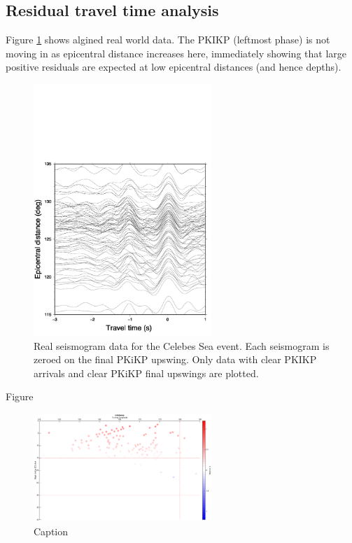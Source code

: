 \documentclass[11pt,a4paper]{article}
\begin{document}
\subsection{Residual travel time analysis}
Figure \ref{fig:Real aligned} shows algined real world data. The PKIKP (leftmost phase) is not moving in as epicentral distance increases here, immediately showing that large positive residuals are expected at low epicentral distances (and hence depths).

\begin{figure}
	\centering
	\includegraphics[width=0.6\textwidth]{figures/celebessea/celebessea_real_aligned.pdf}
	\caption{Real seismogram data for the Celebes Sea event. Each seismogram is zeroed on the final PKiKP upswing. Only data with clear PKIKP arrivals and clear PKiKP final upswings are plotted.}
	\label{fig:Real aligned}
\end{figure}

Figure 
\begin{figure}
	\centering
	\includegraphics[width=0.6\textwidth]{figures/mindanao/mindanao_longitude}
	\caption{Caption}
\end{figure}
\end{document}
